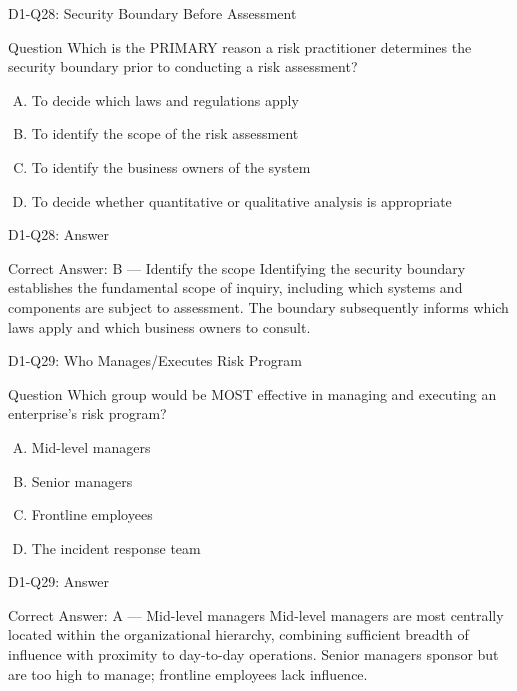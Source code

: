 \documentclass{beamer}
\begin{document}
	\begin{frame}{D1-Q28: Security Boundary Before Assessment}
		\begin{block}{Question}
			Which is the PRIMARY reason a risk practitioner determines the security boundary prior to conducting a risk assessment?
		\end{block}
		\begin{enumerate}[(A)]
			\item To decide which laws and regulations apply
			\item To identify the scope of the risk assessment
			\item To identify the business owners of the system
			\item To decide whether quantitative or qualitative analysis is appropriate
		\end{enumerate}
	\end{frame}
	\begin{frame}{D1-Q28: Answer}
		\begin{block}{Correct Answer: B --- Identify the scope}
			Identifying the security boundary establishes the fundamental scope of inquiry, including which systems and components are subject to assessment. The boundary subsequently informs which laws apply and which business owners to consult.
		\end{block}
	\end{frame}
	
	\begin{frame}{D1-Q29: Who Manages/Executes Risk Program}
		\begin{block}{Question}
			Which group would be MOST effective in managing and executing an enterprise's risk program?
		\end{block}
		\begin{enumerate}[(A)]
			\item Mid-level managers
			\item Senior managers
			\item Frontline employees
			\item The incident response team
		\end{enumerate}
	\end{frame}
	\begin{frame}{D1-Q29: Answer}
		\begin{block}{Correct Answer: A --- Mid-level managers}
			Mid-level managers are most centrally located within the organizational hierarchy, combining sufficient breadth of influence with proximity to day-to-day operations. Senior managers sponsor but are too high to manage; frontline employees lack influence.
		\end{block}
	\end{frame}
	
\end{document}
